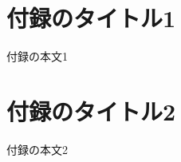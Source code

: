 \documentclass[originalpaper]{jpnsecart}      %
\begin{document}



\appendix

\section{付録のタイトル1}

付録の本文1

\section{付録のタイトル2}

付録の本文2

\begin{biography}
\end{biography}
\end{document}

